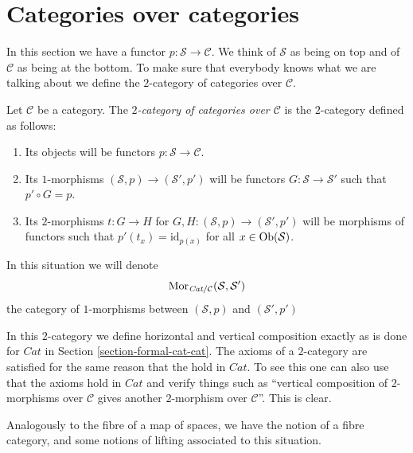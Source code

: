 \section{Categories over categories}
\label{section-categories-over-categories}

\noindent
In this section we have a functor $p : \mathcal{S} \to \mathcal{C}$.
We think of $\mathcal{S}$ as being on top and of $\mathcal{C}$ as being
at the bottom. To make sure that everybody knows what we are talking about
we define the $2$-category of categories over $\mathcal{C}$.

\begin{definition}
\label{definition-categories-over-C}
Let $\mathcal{C}$ be a category.
The {\it $2$-category of categories over $\mathcal{C}$}
is the $2$-category defined as follows:
\begin{enumerate}
\item Its objects will be functors $p : \mathcal{S} \to \mathcal{C}$.
\item Its $1$-morphisms $(\mathcal{S}, p) \to (\mathcal{S}', p')$
will be functors $G : \mathcal{S} \to \mathcal{S}'$ such that
$p' \circ G = p$.
\item Its $2$-morphisms $t : G \to H$ for
$G, H : (\mathcal{S}, p) \to (\mathcal{S}', p')$
will be morphisms of functors
such that $p'(t_x) = \text{id}_{p(x)}$
for all $x \in \mathop{\mathrm{Ob}}\nolimits(\mathcal{S})$.
\end{enumerate}
In this situation we will denote
$$
\mathop{\mathrm{Mor}}\nolimits_{\textit{Cat}/\mathcal{C}}(\mathcal{S}, \mathcal{S}')
$$
the category of $1$-morphisms between
$(\mathcal{S}, p)$ and $(\mathcal{S}', p')$
\end{definition}

\noindent
In this $2$-category we define horizontal and vertical composition
exactly as is done for $\textit{Cat}$ in Section \ref{section-formal-cat-cat}.
The axioms of a $2$-category are satisfied for the same reason
that the hold in $\textit{Cat}$. To see this one can also use that
the axioms hold in $\textit{Cat}$ and verify
things such as ``vertical composition of $2$-morphisms over $\mathcal{C}$
gives another $2$-morphism over $\mathcal{C}$''. This is clear.

\medskip\noindent
Analogously to the fibre of a map of spaces, we have the notion of a
fibre category, and some notions of lifting associated to this
situation.


